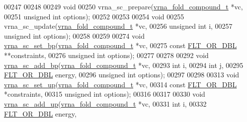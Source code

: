 \begin{DoxyCode}
00247 
00248 
00249 \textcolor{keywordtype}{void}
00250 vrna\_sc\_prepare(\hyperlink{group__fold__compound_structvrna__fc__s}{vrna\_fold\_compound\_t}  *vc,
00251                 \textcolor{keywordtype}{unsigned} \textcolor{keywordtype}{int}          options);
00252 
00253 
00254 \textcolor{keywordtype}{void}
00255 vrna\_sc\_update(\hyperlink{group__fold__compound_structvrna__fc__s}{vrna\_fold\_compound\_t} *vc,
00256                \textcolor{keywordtype}{unsigned} \textcolor{keywordtype}{int}         i,
00257                \textcolor{keywordtype}{unsigned} \textcolor{keywordtype}{int}         options);
00258 
00259 
00274 \textcolor{keywordtype}{void} \hyperlink{group__soft__constraints_ga8e4334b24bc91453fbcda490a4e331af}{vrna\_sc\_set\_bp}(\hyperlink{group__fold__compound_structvrna__fc__s}{vrna\_fold\_compound\_t}  *vc,
00275                     \textcolor{keyword}{const} \hyperlink{group__data__structures_ga31125aeace516926bf7f251f759b6126}{FLT\_OR\_DBL}      **constraints,
00276                     \textcolor{keywordtype}{unsigned} \textcolor{keywordtype}{int}          options);
00277 
00278 
00292 \textcolor{keywordtype}{void} \hyperlink{group__soft__constraints_gaf162aedac7422f2eb16ea030f47d2f4b}{vrna\_sc\_add\_bp}(\hyperlink{group__fold__compound_structvrna__fc__s}{vrna\_fold\_compound\_t}  *vc,
00293                     \textcolor{keywordtype}{int}                   i,
00294                     \textcolor{keywordtype}{int}                   j,
00295                     \hyperlink{group__data__structures_ga31125aeace516926bf7f251f759b6126}{FLT\_OR\_DBL}            energy,
00296                     \textcolor{keywordtype}{unsigned} \textcolor{keywordtype}{int}          options);
00297 
00298 
00313 \textcolor{keywordtype}{void} \hyperlink{group__soft__constraints_ga99ed63f3ef9e7fe3997932030487a344}{vrna\_sc\_set\_up}(\hyperlink{group__fold__compound_structvrna__fc__s}{vrna\_fold\_compound\_t}  *vc,
00314                     \textcolor{keyword}{const} \hyperlink{group__data__structures_ga31125aeace516926bf7f251f759b6126}{FLT\_OR\_DBL}      *constraints,
00315                     \textcolor{keywordtype}{unsigned} \textcolor{keywordtype}{int}          options);
00316 
00317 
00330 \textcolor{keywordtype}{void} \hyperlink{group__soft__constraints_ga069915fe203a2c8e522dd37847177a09}{vrna\_sc\_add\_up}(\hyperlink{group__fold__compound_structvrna__fc__s}{vrna\_fold\_compound\_t}  *vc,
00331                     \textcolor{keywordtype}{int}                   i,
00332                     \hyperlink{group__data__structures_ga31125aeace516926bf7f251f759b6126}{FLT\_OR\_DBL}            energy,

\end{DoxyCode}
